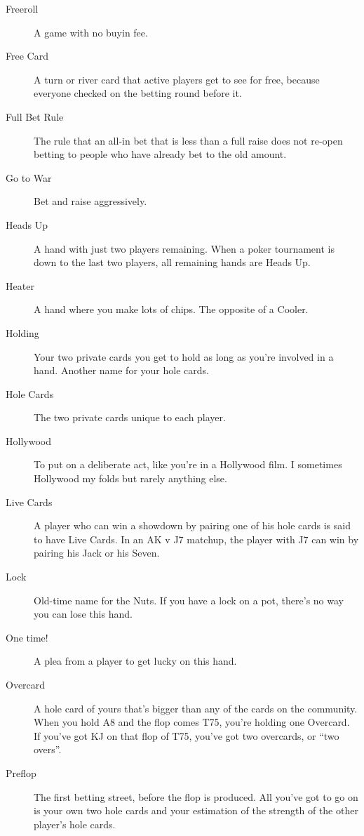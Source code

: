 \begin{description}
\item[Freeroll] A game with no buyin fee.

\item[Free Card] A turn or river card that active players get to see
for free, because everyone checked on the betting round before it.

\item[Full Bet Rule] The rule that an all-in bet that is less than a
full raise does not re-open betting to people who have already bet to
the old amount.

\item[Go to War] Bet and raise aggressively.

\item[Heads Up] A hand with just two players remaining. When a poker
tournament is down to the last two players, all remaining hands are
Heads Up.

\item[Heater] A hand where you make lots of chips. The opposite of a
Cooler.

\item[Holding] Your two private cards you get to hold as long as
you're involved in a hand. Another name for your hole cards.

\item[Hole Cards] The two private cards unique to each player.

\item[Hollywood] To put on a deliberate act, like you're in a
Hollywood film. I sometimes Hollywood my folds but rarely anything
else.

\item[Live Cards] A player who can win a showdown by pairing one of
his hole cards is said to have Live Cards. In an AK v J7 matchup, the
player with J7 can win by pairing his Jack or his Seven.

\item[Lock] Old-time name for the Nuts. If you have a lock on a pot,
there's no way you can lose this hand.

\item[One time!] A plea from a player to get lucky on this hand.

\item[Overcard] A hole card of yours that's bigger than any of the
cards on the community. When you hold A8 and the flop comes T75,
you're holding one Overcard. If you've got KJ on that flop of T75,
you've got two overcards, or ``two overs''.

\item[Preflop] The first betting street, before the flop is produced.
All you've got to go on is your own two hole cards and your estimation
of the strength of the other player's hole cards.


\end{description}
